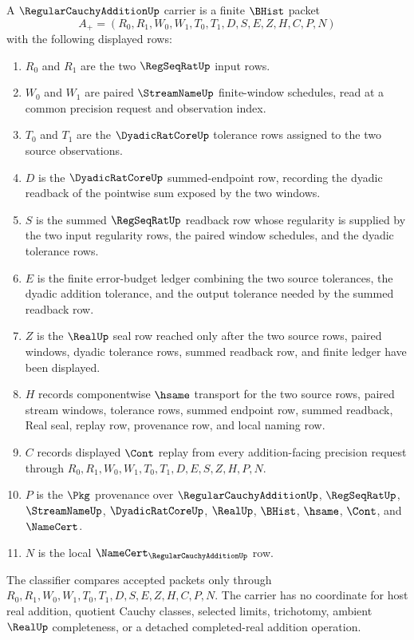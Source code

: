 \begin{definition}
\label{def:regular-cauchy-addition-carrier}
A $\RegularCauchyAdditionUp$ carrier is a finite $\BHist$ packet
$$
A_+=(R_0,R_1,W_0,W_1,T_0,T_1,D,S,E,Z,H,C,P,N)
$$
with the following displayed rows:
\begin{enumerate}
\item $R_0$ and $R_1$ are the two $\RegSeqRatUp$ input rows.
\item $W_0$ and $W_1$ are paired $\StreamNameUp$ finite-window schedules, read at a common precision request and observation index.
\item $T_0$ and $T_1$ are the $\DyadicRatCoreUp$ tolerance rows assigned to the two source observations.
\item $D$ is the $\DyadicRatCoreUp$ summed-endpoint row, recording the dyadic readback of the pointwise sum exposed by the two windows.
\item $S$ is the summed $\RegSeqRatUp$ readback row whose regularity is supplied by the two input regularity rows, the paired window schedules, and the dyadic tolerance rows.
\item $E$ is the finite error-budget ledger combining the two source tolerances, the dyadic addition tolerance, and the output tolerance needed by the summed readback row.
\item $Z$ is the $\RealUp$ seal row reached only after the two source rows, paired windows, dyadic tolerance rows, summed readback row, and finite ledger have been displayed.
\item $H$ records componentwise $\hsame$ transport for the two source rows, paired stream windows, tolerance rows, summed endpoint row, summed readback, Real seal, replay row, provenance row, and local naming row.
\item $C$ records displayed $\Cont$ replay from every addition-facing precision request through $R_0,R_1,W_0,W_1,T_0,T_1,D,E,S,Z,H,P,N$.
\item $P$ is the $\Pkg$ provenance over $\RegularCauchyAdditionUp$, $\RegSeqRatUp$, $\StreamNameUp$, $\DyadicRatCoreUp$, $\RealUp$, $\BHist$, $\hsame$, $\Cont$, and $\NameCert$.
\item $N$ is the local $\NameCert_{\RegularCauchyAdditionUp}$ row.
\end{enumerate}
The classifier compares accepted packets only through $R_0,R_1,W_0,W_1,T_0,T_1,D,S,E,Z,H,C,P,N$. The carrier has no coordinate for host real addition, quotient Cauchy classes, selected limits, trichotomy, ambient $\RealUp$ completeness, or a detached completed-real addition operation.
\end{definition}

